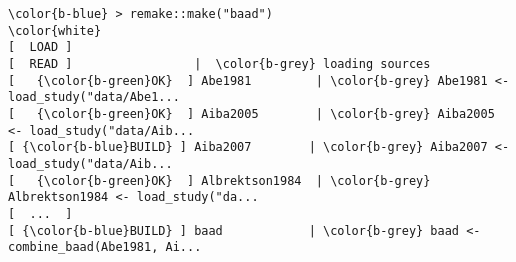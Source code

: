 \documentclass[class=minimal,border=0]{standalone}
\begin{document}
%
\begin{BVerbatim}[bgcolor=b-darkgrey]
\color{b-blue} > remake::make("baad")
\color{white}
[  LOAD ]
[  READ ]                 |  \color{b-grey} loading sources
[   {\color{b-green}OK}  ] Abe1981         | \color{b-grey} Abe1981 <- load_study("data/Abe1...
[   {\color{b-green}OK}  ] Aiba2005        | \color{b-grey} Aiba2005 <- load_study("data/Aib...
[ {\color{b-blue}BUILD} ] Aiba2007        | \color{b-grey} Aiba2007 <- load_study("data/Aib...
[   {\color{b-green}OK}  ] Albrektson1984  | \color{b-grey} Albrektson1984 <- load_study("da...
[  ...  ]
[ {\color{b-blue}BUILD} ] baad            | \color{b-grey} baad <- combine_baad(Abe1981, Ai...

\end{BVerbatim}
\end{document}
